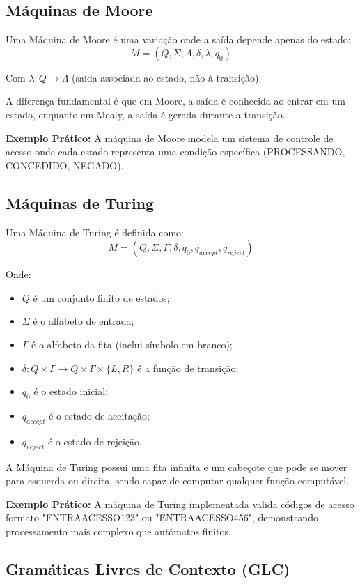 \documentclass[12pt,a4paper]{article}
\begin{document}
\subsection{Máquinas de Moore}

Uma Máquina de Moore é uma variação onde a saída depende apenas do estado:
\[ M = (Q, \Sigma, \Lambda, \delta, \lambda, q_0) \]

Com $\lambda: Q \rightarrow \Lambda$ (saída associada ao estado, não à transição).

A diferença fundamental é que em Moore, a saída é conhecida ao entrar em um estado, enquanto em Mealy, a saída é gerada durante a transição.

\textbf{Exemplo Prático:} A máquina de Moore modela um sistema de controle de acesso onde cada estado representa uma condição específica (PROCESSANDO, CONCEDIDO, NEGADO).

\subsection{Máquinas de Turing}

Uma Máquina de Turing é definida como:
\[ M = (Q, \Sigma, \Gamma, \delta, q_0, q_{accept}, q_{reject}) \]

Onde:
\begin{itemize}
    \item $Q$ é um conjunto finito de estados;
    \item $\Sigma$ é o alfabeto de entrada;
    \item $\Gamma$ é o alfabeto da fita (inclui símbolo em branco);
    \item $\delta: Q \times \Gamma \rightarrow Q \times \Gamma \times \{L, R\}$ é a função de transição;
    \item $q_0$ é o estado inicial;
    \item $q_{accept}$ é o estado de aceitação;
    \item $q_{reject}$ é o estado de rejeição.
\end{itemize}

A Máquina de Turing possui uma fita infinita e um cabeçote que pode se mover para esquerda ou direita, sendo capaz de computar qualquer função computável.

\textbf{Exemplo Prático:} A máquina de Turing implementada valida códigos de acesso formato "ENTRAACESSO123" ou "ENTRAACESSO456", demonstrando processamento mais complexo que autômatos finitos.

\subsection{Gramáticas Livres de Contexto (GLC)}
\end{document}
